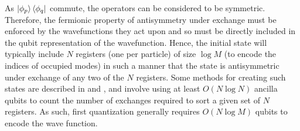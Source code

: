 \documentclass[twoside]{article}
\begin{document}
As $\ket{\phi_p}\bra{\phi_q}$ commute, the operators can be considered to be symmetric. Therefore, the fermionic property of antisymmetry under exchange must be enforced by the wavefunctions they act upon and so must be directly included in the qubit representation of the wavefunction. Hence, the initial state will typically include $N$ registers (one per particle) of size $\log M$ (to encode the indices of occupied modes) in such a manner that the state is antisymmetric under exchange of any two of the $N$ registers. Some methods for creating such states are described in \cite{firstech1} and \cite{firstech2}, and involve using at least $O(N \log N)$ ancilla qubits \cite{firstech2} to count the number of exchanges required to sort a given set of $N$ registers. As such, first quantization generally requires $O(N \log M)$ qubits \cite{tilly} to encode the wave function.
\end{document}
